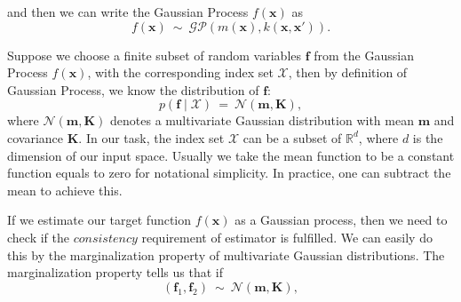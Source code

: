 \documentclass[12pt,a4paper]{article}
\theoremstyle{definition}
\newcommand{\GP}{\mathcal{GP}}
\numberwithin{equation}{section}
\let\vec\mathbf
\begin{document}
and then we can write the Gaussian Process $f(\vec x)$ as
\begin{equation} \label{}
f(\vec x) \  \sim \ \GP\left(m(\vec{x}),k(\vec{x},\vec{x'})  \right).
\end{equation}

Suppose we choose a finite subset of random variables $\vec f$ from the Gaussian Process $f(\vec x)$, with the corresponding index set $\mathcal X$, then by definition of Gaussian Process, we know the distribution of $\vec f$:
\begin{equation} \label{}
p\left(\vec f \mid \mathcal X\right)\ =\ \mathcal N \left(\vec m , \vec K \right),
\end{equation}
where $\mathcal N \left(\vec m , \vec K \right)$ denotes a multivariate Gaussian distribution with mean $\vec m$ and covariance $\vec K$. 
In our task, the index set $\mathcal X$ can be a subset of $\mathbb R ^d$, where $d$ is the dimension of our input space. Usually we take the mean function to be a constant function equals to zero for notational simplicity. In practice, one can subtract the mean to achieve this. 

If we estimate our target function $f(\vec x)$ as a Gaussian process, then we need to check if the $consistency$ requirement of estimator is fulfilled. We can easily do this by the marginalization property of multivariate Gaussian distributions. The marginalization property tells us that if 
\begin{equation*} \label{}
\left(\vec f_1, \vec f_2\right)\ \sim \ \mathcal N \left(\vec m , \vec K \right),
\end{equation*}
\end{document}
